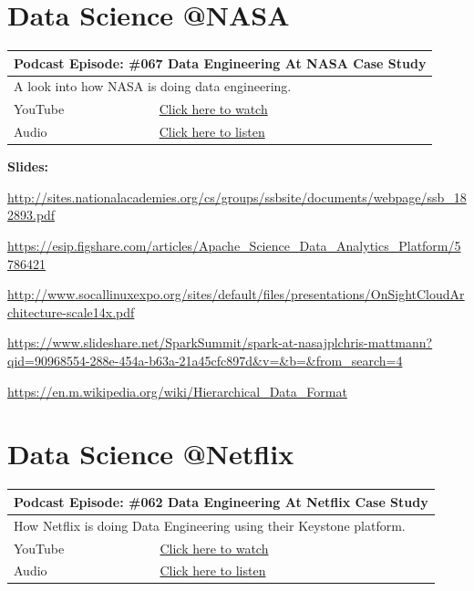 \documentclass[12pt, numbers=noenddot]{scrreprt} %
\begin{document}
\section{Data Science @NASA}

\begin{table}[h]
\begin{tabular}{ll}
\hline
\multicolumn{2}{l}{\textbf{Podcast Episode:} \#067 Data Engineering At NASA Case Study} \\ \hline
\multicolumn{2}{p{15cm}}{A look into how NASA is doing data engineering.}         \\ \hline
\multicolumn{1}{l|}{YouTube}   & \href{https://youtu.be/Pctn_1UoNjA}{Click here to watch}   \\
\multicolumn{1}{l|}{Audio}     & \href{https://anchor.fm/andreaskayy/episodes/067-Data-Engineering-At-NASA-Case-Study-e45ina}{Click here to listen}   \\ \hline
\end{tabular}
\end{table}

\textbf{Slides:}

\url{http://sites.nationalacademies.org/cs/groups/ssbsite/documents/webpage/ssb_182893.pdf}

\url{https://esip.figshare.com/articles/Apache_Science_Data_Analytics_Platform/5786421}

\url{http://www.socallinuxexpo.org/sites/default/files/presentations/OnSightCloudArchitecture-scale14x.pdf}

\url{https://www.slideshare.net/SparkSummit/spark-at-nasajplchris-mattmann?qid=90968554-288e-454a-b63a-21a45cfc897d&v=&b=&from_search=4}

\url{https://en.m.wikipedia.org/wiki/Hierarchical_Data_Format}

\section{Data Science @Netflix}

\begin{table}[h]
\begin{tabular}{ll}
\hline
\multicolumn{2}{l}{\textbf{Podcast Episode:} \#062 Data Engineering At Netflix Case Study} \\ \hline
\multicolumn{2}{p{15cm}}{How Netflix is doing Data Engineering using their Keystone platform.}         \\ \hline
\multicolumn{1}{l|}{YouTube}   & \href{https://youtu.be/YWPsYpjNKeM}{Click here to watch}   \\
\multicolumn{1}{l|}{Audio}     & \href{https://anchor.fm/andreaskayy/episodes/062-Data-Engineering-At-Netflix-Case-Study-e45ikp}{Click here to listen}   \\ \hline
\end{tabular}
\end{table}
\end{document}
